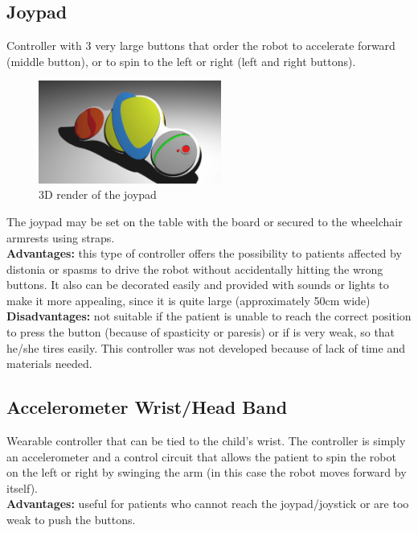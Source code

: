 \documentclass[a4paper,twoside]{book}
\begin{document}
\subsection{Joypad}
Controller with 3 very large buttons that order the robot to accelerate forward (middle button), or to spin to the left or right (left and right buttons).

\begin{figure}
 \includegraphics[width=6cm]{img/controller.eps}
 \caption{3D render of the joypad}
\end{figure}

The joypad may be set on the table with the board or secured to the wheelchair armrests using straps.
\\

\textbf{Advantages:} this type of controller offers the possibility to patients affected by distonia or spasms to drive the robot without accidentally hitting the wrong buttons. It also can be decorated easily and provided with sounds or lights to make it more appealing, since it is quite large (approximately 50cm wide)
\\

\textbf{Disadvantages:} not suitable if the patient is unable to reach the correct position to press the button (because of spasticity or paresis) or if is very weak, so that he/she tires easily.
This controller was not developed because of lack of time and materials needed.

\subsection{Accelerometer Wrist/Head Band}
\label{ssec:accel}
Wearable controller that can be tied to the child's wrist. The controller is simply an accelerometer and a control circuit that allows the patient to spin the robot on the left or right by swinging the arm (in this case the robot moves forward by itself).
\\

\textbf{Advantages:} useful for patients who cannot reach the joypad/joystick or are too weak to push the buttons.
\\
\end{document}
